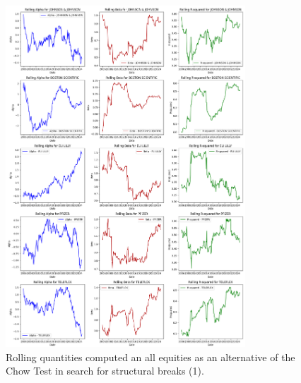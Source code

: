 \documentclass[12pt, openright, twoside]{report}
\begin{document}
\begin{figure}[h]
    \centering
    \includegraphics[width=0.8\textwidth]{images/rolling_quantities_1.png}
    \caption{Rolling quantities computed an all equities as an alternative of the Chow Test in search for structural
    breaks (1).}\label{fig:rolling_quantities_1}
\end{figure}
\end{document}
